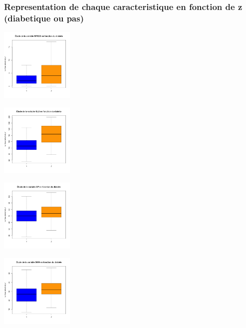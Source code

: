 \documentclass[]{report}
\begin{document}
\subsubsection{Representation de chaque caracteristique en fonction de z (diabetique ou pas)}

\begin{center}
	\begin{minipage}[t]{0.3\textwidth}
		\includegraphics[width=35mm]{Figures/Pima/bxp_z_npreg.png}
	\end{minipage}
	\begin{minipage}[t]{0.3\textwidth}
		\includegraphics[width=35mm]{Figures/Pima/bxp_z_glu.png}	
	\end{minipage}
	\begin{minipage}[t]{0.3\textwidth}
		\includegraphics[width=35mm]{Figures/Pima/bxp_z_bp.png}
	\end{minipage}
	\newline
	\begin{minipage}[t]{0.3\textwidth}
		\includegraphics[width=35mm]{Figures/Pima/bxp_z_skin.png}	

\end{minipage}
\end{center}
\end{document}
